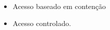 \documentclass[12pt a4paper]{paper}
\begin{document}
\begin{itemize}
  \item Acesso baseado em contenção 
  \item Acesso controlado.
\end{itemize}  













\end{document}
